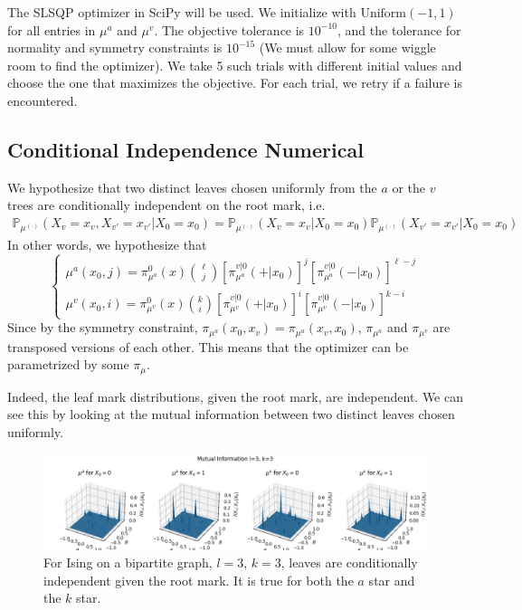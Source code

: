 \documentclass[12pt]{article}
\numberwithin{equation}{section}
\begin{document}
The SLSQP optimizer in SciPy will be used. We initialize with $\text{Uniform}(-1, 1)$ for all entries in $\mu^a$ and $\mu^v$.
The objective tolerance is $10^{-10}$, and the tolerance for normality and symmetry constraints is $10^{-15}$ (We must allow for some
wiggle room to find the optimizer). We take 5 such trials with different initial values and choose the one that maximizes the objective.
For each trial, we retry if a failure is encountered.

\subsection{Conditional Independence Numerical}

We hypothesize that two distinct leaves chosen uniformly from the $a$ or the $v$ trees are conditionally independent on the root mark, i.e.
\begin{align*}
    \mathbb{P}_{\mu^{(\cdot)}}(X_v=x_v, X_{v'}=x_{v'}|X_0=x_0) = \mathbb{P}_{\mu^{(\cdot)}}(X_v=x_v|X_0=x_0)\mathbb{P}_{\mu^{(\cdot)}}(X_{v'}=x_{v'}|X_0=x_0)
\end{align*}
In other words, we hypothesize that
\begin{equation*}
    \begin{cases}
        \mu^a(x_0, j)=\pi_{\mu^a}^0(x){\ell\choose j}[\pi_{\mu^a}^{v|0}(+|x_0)]^j[\pi_{\mu^a}^{v|0}(-|x_0)]^{\ell-j} \\
        \mu^v(x_0, i)=\pi_{\mu^v}^0(x){k\choose i}[\pi_{\mu^v}^{v|0}(+|x_0)]^i[\pi_{\mu^v}^{v|0}(-|x_0)]^{k-i}
    \end{cases}
\end{equation*}
Since by the symmetry constraint, $\pi_{\mu^a}(x_0, x_v)=\pi_{\mu^a}(x_v, x_0)$, $\pi_{\mu^a}$ and $\pi_{\mu^v}$ are transposed versions
of each other. This means that the optimizer can be parametrized by some $\pi_\mu$.

Indeed, the leaf mark distributions, given the root mark, are independent. We can see this by looking at the mutual information
between two distinct leaves chosen uniformly.

\begin{figure}[h]
    \centering
    \includegraphics[width=16cm]{img/Ising_bptt/CI_l3_k3.png}
    \caption{For Ising on a bipartite graph, $l=3$, $k=3$, leaves are conditionally independent given the root mark. It is true for both the $a$ star
        and the $k$ star.}
    \label{Eq.ISBP-CI-l3-k3}
\end{figure}
\end{document}
